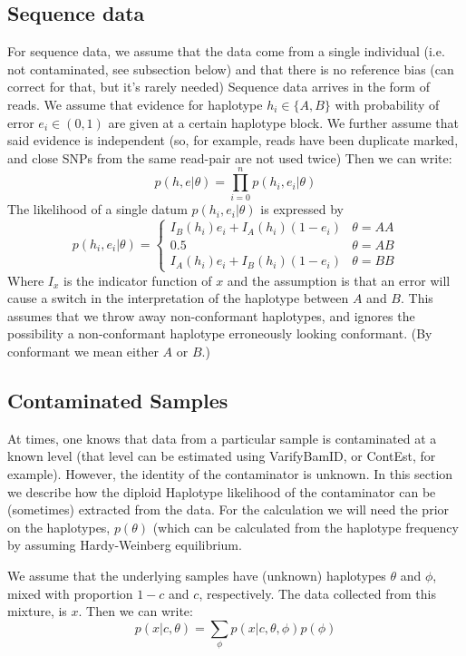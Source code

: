 \documentclass[12pt]{article}
\begin{document}
\subsection{Sequence data}
For sequence data, we assume that the data come from a single individual (i.e. not contaminated, see subsection below) and that there is no reference bias (can correct for that, but it's rarely needed)
Sequence data arrives in the form of reads. 
We assume that evidence for haplotype $h_i\in\{A,B\}$ with probability of error $e_i\in(0,1)$ are given at a certain haplotype block.
We further assume that said evidence is independent (so, for example, reads have been duplicate marked, and close SNPs from the same read-pair are not used twice)
Then we can write:
\begin{equation}
p(h,e|\theta)=\prod_{i=0}^n p(h_i,e_i|\theta)
\end{equation}
The likelihood of a single datum $p(h_i,e_i|\theta)$ is expressed by
\begin{equation}
p(h_i,e_i|\theta)=\begin{cases}
I_B(h_i)e_i + I_A(h_i)(1-e_i) & \theta=AA\\
0.5 & \theta=AB\\
I_A(h_i)e_i + I_B(h_i)(1-e_i) &  \theta=BB
\end{cases}
\end{equation}
Where $I_x$ is the indicator function of $x$ and the assumption is that an error will cause a switch in the interpretation of the haplotype between $A$ and $B$.
This assumes that we throw away non-conformant haplotypes, and ignores the possibility a non-conformant haplotype erroneously looking conformant. (By conformant we mean either $A$ or $B$.)


\subsection{Contaminated Samples}
At times, one knows that data from a particular sample is contaminated at a known level (that level can be estimated using VarifyBamID, or ContEst, for example). 
However, the identity of the contaminator is unknown. 
In this section we describe how the diploid Haplotype likelihood of the contaminator can be (sometimes) extracted from the data.
For the calculation we will need the prior on the haplotypes, $p(\theta)$ (which can be calculated from the haplotype frequency by assuming Hardy-Weinberg equilibrium.

We assume that the underlying samples have (unknown) haplotypes $\theta$ and $\phi$, mixed with proportion $1-c$ and $c$, respectively. The data collected from this mixture, is $x$.
Then we can write: 
\begin{equation}
p(x|c,\theta)=\sum_\phi p(x|c,\theta,\phi)p(\phi)
\end{equation}
\end{document}
